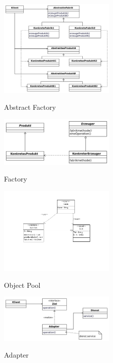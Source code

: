 \begin{figure}[h]
	\begin{center}
		\includegraphics[width=0.5\textwidth]{images/abstract_factory}
		\label{fig:abstract_factory}
		\caption{Abstract Factory}
	\end{center}
\end{figure}

\begin{figure}[h]
	\begin{center}
		\includegraphics[width=0.5\textwidth]{images/factory}
		\label{fig:factory}
		\caption{Factory}
	\end{center}
\end{figure}

\begin{figure}[h]
	\begin{center}
		\includegraphics[width=0.5\textwidth]{images/object_pool}
		\label{fig:object_pool}
		\caption{Object Pool}
	\end{center}
\end{figure}

\begin{figure}[h]
	\begin{center}
		\includegraphics[width=0.5\textwidth]{images/adapter}
		\label{fig:adapter}
		\caption{Adapter}
	\end{center}
\end{figure}

